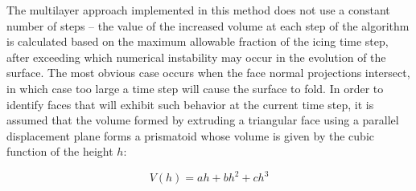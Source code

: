 \documentclass[
11pt,%
tightenlines,%
twoside,%
onecolumn,%
nofloats,%
nobibnotes,%
nofootinbib,%
superscriptaddress,%
noshowpacs,%
centertags]%
{revtex4-2}
\begin{document}
The multilayer approach implemented in this method does not use a constant number of steps -- the value of the increased volume at each step of the algorithm is calculated based on the maximum allowable fraction of the icing time step, after exceeding which numerical instability may occur in the evolution of the surface.
The most obvious case occurs when the face normal projections intersect, in which case too large a time step will cause the surface to fold.
In order to identify faces that will exhibit such behavior at the current time step, it is assumed that the volume formed by extruding a triangular face using a parallel displacement plane forms a prismatoid whose volume is given by the cubic function of the height $h$:

\begin{equation}\label{Tong:1}
V(h)=ah+bh^2+ch^3
\end{equation}
\end{document}

